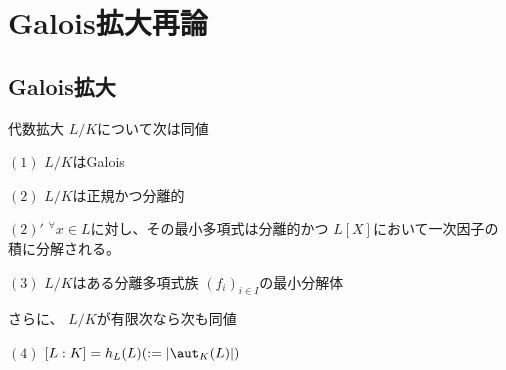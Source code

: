 \documentclass[../master_galois_theory]{subfiles}
\begin{document}
\setcounter{section}{11}

\section{Galois拡大再論}

\subsection{Galois拡大}

\begin{prop} \label{prop:12.1}
  代数拡大 $L/K$について次は同値

  $(1)$
  $L/K$は\rm{Galois}

  $(2)$
  $L/K$は正規かつ分離的

  $(2)'$
  ${}^\forall x \in L$に対し、その最小多項式は分離的かつ
  $L[X]$において一次因子の積に分解される。

  $(3)$
  $L/K$はある分離多項式族 $(f_i)_{i \in I}$の最小分解体

  さらに、 $L/K$が有限次なら次も同値

  $(4)$
  $[L:K] = h_L(L) (:= |\aut_K(L)|)$
\end{prop}
\end{document}
